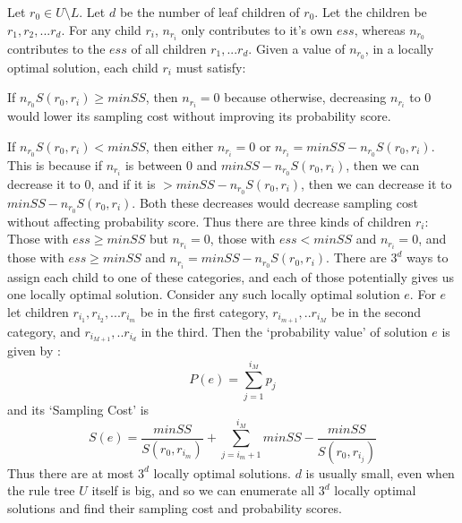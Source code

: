 Let $r_0 \in U \setminus L$. Let $d$ be the number of leaf children of $r_0$. Let the children be $r_1, r_2, ... r_d$. For any child $r_i$, $n_{r_i}$ only contributes to it's own $ess$, whereas $n_{r_0}$ contributes to the $ess$ of all children $r_1, ... r_d$. Given a value of $n_{r_0}$, in a locally optimal solution, each child $r_i$ must satisfy:
\squishlist
\item If $n_{r_0}S(r_0, r_i) \geq minSS$, then $n_{r_i} = 0$ because otherwise, decreasing $n_{r_i}$ to $0$ would lower its sampling cost without improving its probability score. 
\item If $n_{r_0}S(r_0, r_i) < minSS$, then either $n_{r_i} = 0$ or $n_{r_i} = minSS - n_{r_0}S(r_0, r_i)$. This is because if $n_{r_i}$ is between $0$ and $minSS - n_{r_0}S(r_0, r_i)$, then we can decrease it to $0$, and if it is $> minSS - n_{r_0}S(r_0, r_i)$, then we can decrease it to $minSS - n_{r_0}S(r_0, r_i)$. Both these decreases would decrease sampling cost without affecting probability score. 
\squishend
Thus there are three kinds of children $r_i$: Those with $ess \geq minSS$ but $n_{r_i} = 0$, those with $ess < minSS$ and $n_{r_i} = 0$, and those with $ess \geq minSS$ and $n_{r_i} = minSS - n_{r_0}S(r_0, r_i)$. There are $3^d$ ways to assign each child to one of these categories, and each of those potentially gives us one locally optimal solution. Consider any such locally optimal solution $e$. For $e$ let children $r_{i_1}, r_{i_2}, ... r_{i_m}$ be in the first category, $r_{i_{m+1}}, .. r_{i_M}$ be in the second category, and $r_{i_{M+1}}, .. r_{i_d}$ in the third.  Then the `probability value' of solution $e$ is given by : 
$$P(e) = \sum_{j = 1}^{i_M}p_{j}$$
and its `Sampling Cost' is
$$S(e) = \frac{minSS}{S(r_0, r_{i_m})} + \sum_{j=i_m+1}^{i_M} minSS - \frac{minSS}{S(r_0, r_{i_j})}$$
Thus there are at most $3^d$ locally optimal solutions. $d$ is usually small, even when the rule tree $U$ itself is big, and so we can enumerate all $3^d$ locally optimal solutions and find their sampling cost and probability scores. 

\begin{comment}
Let $r_0 \in U \setminus L$. Let $d$ be the number of leaf children of $r_0$. Let the children be $r_1, r_2, ... r_d$, ordered such that $S(r_0, r_i) > S(r_0, r_j) \forall i > j$. Then we can show that for any locally optimal solution, there exist integers $i_m, i_M$ such that the following conditions hold:
$$1 \leq i_m \leq i_M \leq d$$
$$n_{r_0} = \frac{minSS}{S(r_0, r_{i_m})}$$
$$1 \leq j \leq i_m \Rightarrow n_{r_j} = 0$$
$$i_m < j \leq i_M \Leftrightarrow n_{r_j} = minSS - \frac{minSS}{S(r_0, r_{i_j})}$$
$$i_M < j \Rightarrow n_{r_j} = 0$$
And thus
$$ess(r_j) \geq minSS \Leftrightarrow j \leq i_M$$

Call this locally optimal solution $e$. Then we define its `probability value' to be
$$P(e) = \sum_{j = 1}^{i_M}p_{j}$$
and its `Sampling Cost' to be
$$S(e) = \frac{minSS}{S(r_0, r_{i_m})} + \sum_{j=i_m+1}^{i_M} minSS - \frac{minSS}{S(r_0, r_{i_j})}$$
Since there are at most $d^2$ possible values of $i_m$ and $i_M$, we can try out all of them and obtain all locally optimal solutions. 
\end{comment}

